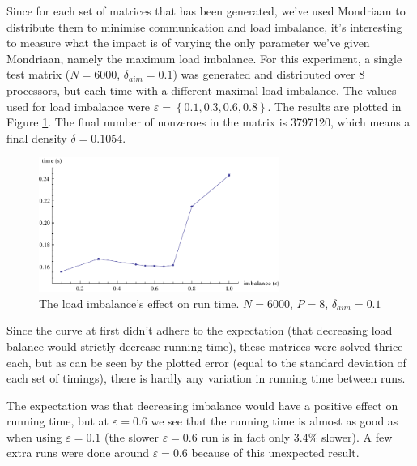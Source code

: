 \documentclass[a4paper]{article}
\newcommand{\plotsize}{0.7\textwidth}
\begin{document}
Since for each set of matrices that has been generated, we've used Mondriaan to
distribute them to minimise communication and load imbalance, it's interesting to
measure what the impact is of varying the only parameter we've given Mondriaan, namely
the maximum load imbalance. For this experiment, a single test matrix ($N=6000$, $\delta_{aim}=0.1$) was generated and distributed
over 8 processors, but each time with a different maximal load imbalance. The
values used for load imbalance were $\varepsilon = \left\{  0.1, 0.3, 0.6, 0.8\right\}$. The results
are plotted in Figure \ref{fig:imbalance}. The final number of nonzeroes in the matrix is 3797120, which
means a final density $\delta=0.1054$.

\begin{figure}[h]
    \begin{center}
        \includegraphics[width=\plotsize]{img/imbalance.pdf}
    \end{center}
    \caption{The load imbalance's effect on run time. $N=6000$, $P=8$, $\delta_{aim}=0.1$}
    \label{fig:imbalance}
\end{figure}

Since the curve at first didn't adhere to the expectation (that decreasing load balance
would strictly decrease running time), these matrices were solved thrice each, but as can
be seen by the plotted error (equal to the standard deviation of each set of timings), there is
hardly any variation in running time between runs.

The expectation was that decreasing imbalance would have a positive effect on running time, but at
$\varepsilon=0.6$ we see that the running time is almost as good as when using $\varepsilon=0.1$ (the
slower $\varepsilon=0.6$ run is in fact only 3.4\% slower). A few extra runs were done around $\varepsilon=0.6$
because of this unexpected result.
\end{document}

